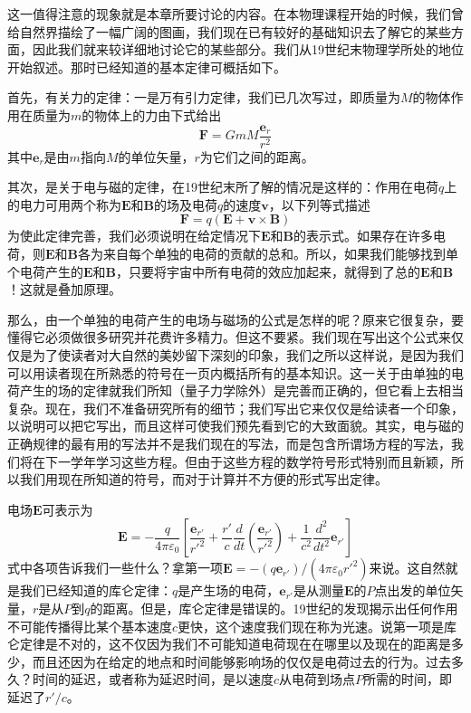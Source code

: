 这一值得注意的现象就是本章所要讨论的内容。在本物理课程开始的时候，我们曾给自然界描绘了一幅广阔的图画，我们现在已有较好的基础知识去了解它的某些方面，因此我们就来较详细地讨论它的某些部分。我们从19世纪末物理学所处的地位开始叙述。那时已经知道的基本定律可概括如下。

首先，有关力的定律：一是万有引力定律，我们已几次写过，即质量为$M$的物体作用在质量为$m$的物体上的力由下式给出
\begin{equation}
    \label{Eq:I:28:1}
    \boldsymbol{F} = GmM\frac{\boldsymbol{e}_r}{r^2}
\end{equation}
其中$\boldsymbol{e}_r$是由$m$指向$M$的单位矢量，$r$为它们之间的距离。

其次，是关于电与磁的定律，在19世纪末所了解的情况是这样的：作用在电荷$q$上的电力可用两个称为$\boldsymbol{E}$和$\boldsymbol{B}$的场及电荷$q$的速度$\boldsymbol{v}$，以下列等式描述
\begin{equation}
    \label{Eq:I:28:2}
    \boldsymbol{F} = q(\boldsymbol{E} + \boldsymbol{v} \times \boldsymbol{B})
\end{equation}
为使此定律完善，我们必须说明在给定情况下$\boldsymbol{E}$和$\boldsymbol{B}$的表示式。如果存在许多电荷，则$\boldsymbol{E}$和$\boldsymbol{B}$各为来自每个单独的电荷的贡献的总和。所以，如果我们能够找到单个电荷产生的$\boldsymbol{E}$和$\boldsymbol{B}$，只要将宇宙中所有电荷的效应加起来，就得到了总的$\boldsymbol{E}$和$\boldsymbol{B}$！这就是叠加原理。

那么，由一个单独的电荷产生的电场与磁场的公式是怎样的呢？原来它很复杂，要懂得它必须做很多研究并花费许多精力。但这不要紧。我们现在写出这个公式来仅仅是为了使读者对大自然的美妙留下深刻的印象，我们之所以这样说，是因为我们可以用读者现在所熟悉的符号在一页内概括所有的基本知识。这一关于由单独的电荷产生的场的定律就我们所知（量子力学除外）是完善而正确的，但它看上去相当复杂。现在，我们不准备研究所有的细节；我们写出它来仅仅是给读者一个印象，以说明可以把它写出，而且这样可使我们预先看到它的大致面貌。其实，电与磁的正确规律的最有用的写法并不是我们现在的写法，而是包含所谓场方程的写法，我们将在下一学年学习这些方程。但由于这些方程的数学符号形式特别而且新颖，所以我们用现在所知道的符号，而对于计算并不方便的形式写出定律。

电场$\boldsymbol{E}$可表示为
\begin{equation}
    \label{Eq:I:28:3}
    \boldsymbol{E} = -\frac{q}{4\pi\varepsilon_0} \left [ \frac{\boldsymbol{e}_{r'}}{{r'}^2} + \frac{r'}{c} \frac{d}{dt} \left ( \frac{\boldsymbol{e}_{r'}}{{r'}^2} \right ) + \frac{1}{c^2}\frac{d^2}{dt^2}\boldsymbol{e}_{r'} \right ]
\end{equation}
式中各项告诉我们一些什么？拿第一项$\boldsymbol{E}=-(q\boldsymbol{e}_{r'})/(4\pi\varepsilon_0{r'}^2)$来说。这自然就是我们已经知道的库仑定律：$q$是产生场的电荷，$\boldsymbol{e}_{r'}$是从测量$\boldsymbol{E}$的$P$点出发的单位矢量，$r$是从$P$到$q$的距离。但是，库仑定律是错误的。19世纪的发现揭示出任何作用不可能传播得比某个基本速度$c$更快，这个速度我们现在称为光速。说第一项是库仑定律是不对的，这不仅因为我们不可能知道电荷现在在哪里以及现在的距离是多少，而且还因为在给定的地点和时间能够影响场的仅仅是电荷过去的行为。过去多久？时间的延迟，或者称为延迟时间，是以速度$c$从电荷到场点$P$所需的时间，即延迟了$r'/c$。


